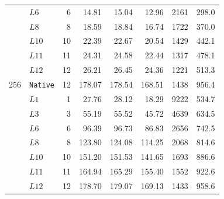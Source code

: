 \documentclass{article}
\begin{document}
\begin{table}[t]
\begin{tabular}{llrrrrrr}
         & \(L6\) & 6 & 14.81 & 15.04 & 12.96 & 2161 & 298.0 \\
         & \(L8\) & 8 & 18.59 & 18.84 & 16.74 & 1722 & 370.0 \\
         & \(L10\) & 10 & 22.39 & 22.67 & 20.54 & 1429 & 442.1 \\
         & \(L11\) & 11 & 24.31 & 24.58 & 22.44 & 1317 & 478.1 \\
         & \(L12\) & 12 & 26.21 & 26.45 & 24.36 & 1221 & 513.3 \\
        \midrule
        256 & \texttt{Native} & 12 & 178.07 & 178.54 & 168.51 & 1438 & 956.4 \\
         & \(L1\) & 1 & 27.76 & 28.12 & 18.29 & 9222 & 534.7 \\
         & \(L3\) & 3 & 55.19 & 55.52 & 45.72 & 4639 & 634.5 \\
         & \(L6\) & 6 & 96.39 & 96.73 & 86.83 & 2656 & 742.5 \\
         & \(L8\) & 8 & 123.80 & 124.08 & 114.25 & 2068 & 814.6 \\
         & \(L10\) & 10 & 151.20 & 151.53 & 141.65 & 1693 & 886.6 \\
         & \(L11\) & 11 & 164.94 & 165.29 & 155.40 & 1552 & 922.6 \\
         & \(L12\) & 12 & 178.70 & 179.07 & 169.13 & 1433 & 958.6 \\
        \bottomrule
    \end{tabular}
\end{table}


\clearpage

\end{document}
